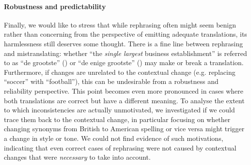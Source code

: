 \paragraph{Robustness and predictability}
Finally, we would like to stress that while rephrasing often might seem benign rather than concerning from the perspective of emitting adequate translations, its harmlessness still deserves some thought.
There is a fine line between rephrasing and mistranslating: whether ``the \textit{single largest} business establishment'' is referred to as ``de grootste'' () or ``de enige grootste'' () may make or break a translation. 
Furthermore, if changes are unrelated to the contextual change (e.g. replacing ``soccer'' with ``football''), this can be undesirable from a robustness and reliability perspective.
This point becomes even more pronounced in cases where both translations are correct but have a different meaning.
To analyse the extent to which inconsistencies are actually unmotivated, we investigated if we could trace them back to the contextual change, in particular focusing on whether changing synonyms from British to American spelling or vice versa might trigger a change in style or tone.
We could not find evidence of such motivations, indicating that even correct cases of rephrasing were not caused by contextual changes that were \emph{necessary} to take into account.
